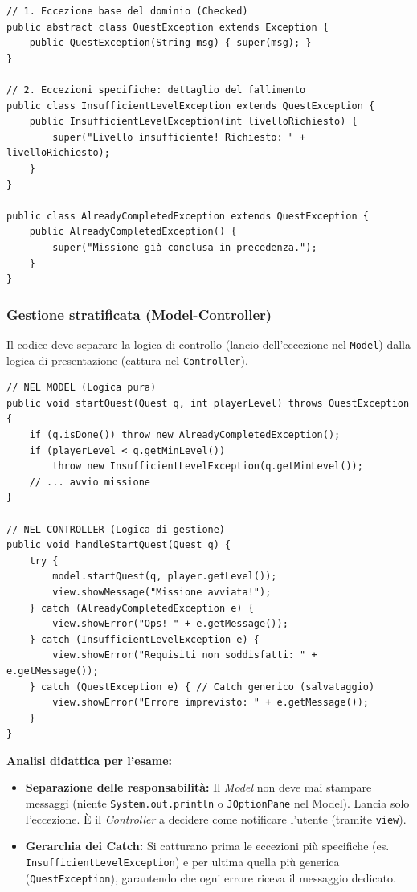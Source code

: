\documentclass[12pt, a4paper]{article}
\begin{document}
\begin{verbatim}
// 1. Eccezione base del dominio (Checked)
public abstract class QuestException extends Exception {
    public QuestException(String msg) { super(msg); }
}

// 2. Eccezioni specifiche: dettaglio del fallimento
public class InsufficientLevelException extends QuestException {
    public InsufficientLevelException(int livelloRichiesto) {
        super("Livello insufficiente! Richiesto: " + livelloRichiesto);
    }
}

public class AlreadyCompletedException extends QuestException {
    public AlreadyCompletedException() {
        super("Missione già conclusa in precedenza.");
    }
}
\end{verbatim}

\newpage

\subsubsection{Gestione stratificata (Model-Controller)}
Il codice deve separare la logica di controllo (lancio dell'eccezione nel \texttt{Model}) dalla logica di presentazione (cattura nel \texttt{Controller}).

\begin{verbatim}
// NEL MODEL (Logica pura)
public void startQuest(Quest q, int playerLevel) throws QuestException {
    if (q.isDone()) throw new AlreadyCompletedException();
    if (playerLevel < q.getMinLevel()) 
        throw new InsufficientLevelException(q.getMinLevel());
    // ... avvio missione
}

// NEL CONTROLLER (Logica di gestione)
public void handleStartQuest(Quest q) {
    try {
        model.startQuest(q, player.getLevel());
        view.showMessage("Missione avviata!");
    } catch (AlreadyCompletedException e) {
        view.showError("Ops! " + e.getMessage());
    } catch (InsufficientLevelException e) {
        view.showError("Requisiti non soddisfatti: " + e.getMessage());
    } catch (QuestException e) { // Catch generico (salvataggio)
        view.showError("Errore imprevisto: " + e.getMessage());
    }
}
\end{verbatim}

\textbf{Analisi didattica per l'esame:}
\begin{itemize}
    \item \textbf{Separazione delle responsabilità:} Il \textit{Model} non deve mai stampare messaggi (niente \texttt{System.out.println} o \texttt{JOptionPane} nel Model). Lancia solo l'eccezione. È il \textit{Controller} a decidere come notificare l'utente (tramite \texttt{view}).
    \item \textbf{Gerarchia dei Catch:} Si catturano prima le eccezioni più specifiche (es. \texttt{InsufficientLevelException}) e per ultima quella più generica (\texttt{QuestException}), garantendo che ogni errore riceva il messaggio dedicato.
\end{itemize}
\end{document}
